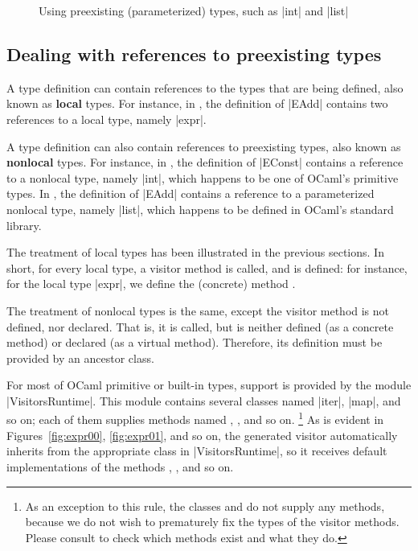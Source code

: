 \documentclass[11pt,a4paper,twoside]{article}
\renewcommand{\emph}[1]{\textbf{#1}}
\begin{document}

\begin{figure}[t]
\vspace{-\baselineskip}
\caption{Using preexisting (parameterized) types, such as \oc|int| and \oc|list|}
\label{fig:expr11}
\end{figure}



\subsection{Dealing with references to preexisting types}
\label{sec:intro:nonlocal}

A type definition can contain references to the types that are being defined,
also known as \emph{local} types. For instance, in , the
definition of \oc|EAdd| contains two references to a local type, namely
\oc|expr|.

A type definition can also contain references to preexisting types, also
known as \emph{nonlocal} types. For instance, in , the
definition of \oc|EConst| contains a reference to a nonlocal type, namely
\oc|int|, which happens to be one of OCaml's primitive types. In
, the definition of \oc|EAdd| contains a reference to a
parameterized nonlocal type, namely \oc|list|, which happens to be defined in
OCaml's standard library.

The treatment of local types has been illustrated in the previous sections. In
short, for every local type, a visitor method is called, and is defined:
for instance, for the local type \oc|expr|, we define the (concrete) method
.

The treatment of nonlocal types is the same, except the visitor method is not
defined, nor declared. That is, it is called, but is neither defined (as a
concrete method) or declared (as a virtual method). Therefore, its definition
must be provided by an ancestor class.

For most of OCaml primitive or built-in types, support is provided by the
module \oc|VisitorsRuntime|. This module contains several classes named
\oc|iter|, \oc|map|, and so on; each of them supplies methods named
, , and so on.%
%
\footnote{As an exception to this rule, the classes 
  and  do not supply any methods, because we do not
  wish to prematurely fix the types of the visitor methods. Please consult
   to check which methods exist and what they
  do.} %
%
As is evident in Figures~\ref{fig:expr00}, \ref{fig:expr01}, and so on, the
generated visitor automatically inherits from the appropriate class in
\oc|VisitorsRuntime|, so it receives default implementations of the methods
, , and so on.
\end{document}
